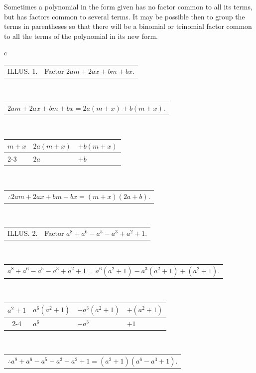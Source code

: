 \documentclass{book}
\begin{document}
Sometimes a polynomial in the form given has no
factor common to all its terms, but has factors common
to several terms. It may be possible then to
group the terms in parentheses so that there will be
a binomial or trinomial factor common to all the terms
of the polynomial in its new form.

\begin{tabular}{c}
\begin{tabular}{ll}
ILLUS. 1. & Factor $2am+2ax+bm+bx$.\\
\end{tabular}\\

\begin{tabular}{c}
$2am+2ax+bm+bx=2a(m+x)+b(m+x).$\\
\end{tabular}\\

\begin{tabular}{lll}
$  m+x$ &\multicolumn{1}{|l}{$ 2a(m+x)$}&$ + b(m+x) $\\
\cline{2-3}
 &    $2a $&$+ b$\\
\end{tabular}\\
\begin{tabular}{c}
$\therefore 2am+2ax+bm+bx=(m+x)(2a+b).$
\end{tabular}\\

\begin{tabular}{ll}
ILLUS. 2.  &Factor $a^8+a^6-a^5-a^3+a^2+1$.\\
\end{tabular}\\

\begin{tabular}{c}
$a^8+a^6-a^5-a^3+a^2+1=a^6(a^2+1)-a^3(a^2+1)+(a^2+1).$
\end{tabular}\\

\begin{tabular}{clll}
$ a^2+1$ &\multicolumn{1}{|l}{$ a^6(a^2+1)$}&$ - a^3(a^2+1)$&$ + (a^2+1)$ \\
\cline{2-4} &$ a^6$ &$- a^3 $&$+ 1$\\
\end{tabular}\\
\begin{tabular}{c}
$\therefore a^8+a^6-a^5-a^3+a^2+1=(a^2+1)(a^6-a^3+1).$
\end{tabular}
\end{tabular}
\end{document}
